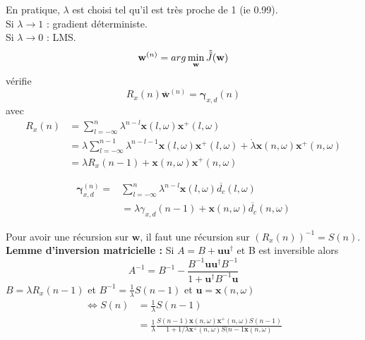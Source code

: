 \documentclass[12pt]{article}
\begin{document}
En pratique, $\lambda$ est choisi tel qu'il est très proche de 1 (ie 0.99).\\
Si $\lambda \rightarrow 1$ : gradient déterministe.\\
Si $\lambda \rightarrow 0$ : LMS.\\

$$\mathbf{w}^{(n)} = arg\min_{\mathbf{w}} \Tilde{\Tilde{J}}(\mathbf{w})$$
vérifie $$R_x(n) \overline{\mathbf{w}}^{(n)} = \mathbf{\gamma}_{x,d}(n)$$
avec 
\begin{align}
    R_x(n) &= \sum_{l=-\infty}^n \lambda^{n-l} \mathbf{x}(l,\omega) \mathbf{x}^+(l,\omega)  \nonumber \\
    &= \lambda \sum_{l=-\infty}^{n-1} \lambda^{n-l-1} \mathbf{x}(l,\omega) \mathbf{x}^+(l,\omega) + \mathring{\lambda} \mathbf{x}(n,\omega) \mathbf{x}^+(n,\omega) \nonumber \\
    &= \lambda R_x(n-1) + \mathbf{x}(n,\omega) \mathbf{x}^+(n,\omega) \nonumber
\end{align}

\begin{align}
    \mathbf{\gamma}_{x,d}^{(n)} =& \sum_{l=-\infty}^{n} \lambda^{n-l} \mathbf{x}(l,\omega) \overline{d_c}(l,\omega) \nonumber \\
    &= \lambda \gamma_{x,d}(n-1) + \mathbf{x}(n,\omega) \overline{d_c}(n,\omega) \nonumber
\end{align}

Pour avoir une récursion sur $\mathbf{w}$, il faut une récursion sur $(R_x(n))^{-1} = S(n)$.\\

\textbf{Lemme d'inversion matricielle :} Si $A= B + \mathbf{u} \mathbf{u}^\dag$ et B est inversible alors $$A^{-1} = B^{-1} - \frac{B^{-1} \mathbf{u} \mathbf{u}^\dag B^{-1}}{1+  \mathbf{u}^\dag B^{-1}\mathbf{u}}$$
$B = \lambda R_x(n-1)$ et $B^{-1} = \frac{1}{\lambda}S(n-1)$ et $\mathbf{u} = \mathbf{x}(n,\omega)$
\begin{align}
    \Leftrightarrow S(n) &= \frac{1}{\lambda} S(n-1) \nonumber \\
    &= \frac{1}{\lambda} \frac{S(n-1) \mathbf{x}(n,\omega) \mathbf{x}^+(n,\omega) S(n-1)}{1+1/ \lambda   \mathbf{x}^+(n,\omega) S(n-1 \mathbf{x}(n,\omega)} \nonumber 
\end{align}
\end{document}
